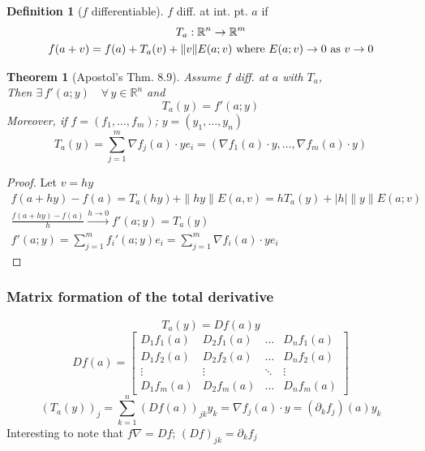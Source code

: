 \documentclass[twoside]{amsart}
\theoremstyle{plain}
\newtheorem{theorem}{Theorem}
\theoremstyle{definition}
\newtheorem{definition}{Definition}
\begin{document}
\begin{definition}[$f$ differentiable]
  $f$ diff. at int. pt. $a$ if 
\begin{gather}
  T_a: \mathbb{R}^n \to \mathbb{R}^m \notag \\
  f(a+v) = f(a) + T_a(v) + \| v\| E(a;v) \text{ where } E(a;v) \to 0 \text{ as } v \to 0
\end{gather}
\end{definition}

\begin{theorem}[Apostol's Thm. 8.9] Assume $f$ diff. at $a$ with $T_a$, \\
  Then $\exists \, f'(a;y) \quad \forall \, y \in \mathbb{R}^n$ and 
\begin{equation}
  T_a(y) = f'(a;y) 
\end{equation}
Moreover, if $f= (f_1, \dots, f_m)$; $y = (y_1, \dots, y_n)$ 
\begin{equation}
  T_a(y) = \sum_{j=1}^m \nabla f_j (a) \cdot y e_i = (\nabla f_1(a) \cdot y, \dots, \nabla f_m(a) \cdot y )
\end{equation}
\end{theorem}
\begin{proof}
Let $v=hy$
\[
\begin{gathered}
  f(a+hy) - f(a) = T_a(hy) + \| hy \| E(a,v) = hT_a(y) + |h| \| y\| E(a;v) \\
  \frac{ f(a+hy) - f(a) }{ h} \xrightarrow{ h\to 0} f'(a;y) = T_a(y) \\
  f'(a;y) = \sum_{j=1}^m f_i'(a;y) e_i = \sum_{j=1}^m \nabla f_i(a) \cdot y e_i 
\end{gathered}
\]
\end{proof}

\subsubsection{ Matrix formation of the total derivative }
\[
T_a(y) = Df(a) y
\]
\[
Df(a) = \left[ \begin{matrix} D_1 f_1(a) & D_2 f_1(a) & \dots & D_n f_1(a) \\
    D_1 f_2(a) & D_2 f_2(a) & \dots & D_n f_2(a) \\
    \vdots & \vdots & \ddots & \vdots \\
    D_1 f_m(a) & D_2 f_m(a) & \dots & D_n f_m(a) 
\end{matrix} \right]
\]
\[
(T_a(y))_j = \sum_{k=1}^n (Df(a))_{jk} y_k = \nabla f_j (a) \cdot y = (\partial_k f_j )(a) y_k
\]
Interesting to note that $f\nabla = Df$; $(Df)_{jk} = \partial_k f_j$
\end{document}
